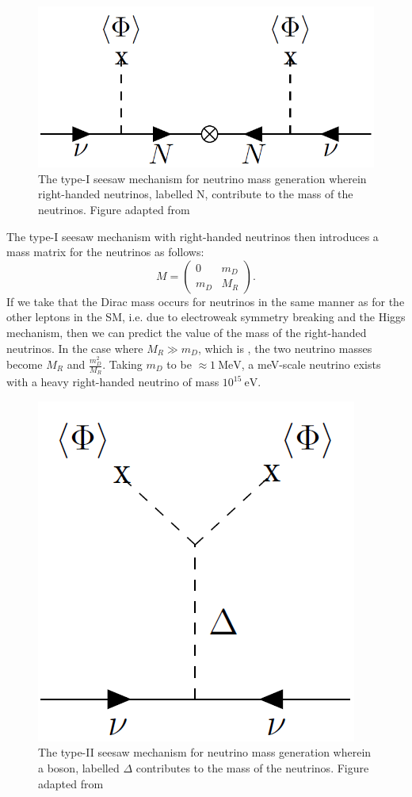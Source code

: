 \begin{figure}[tbph]
\centering
\includegraphics[width=0.40\linewidth]{Figures/TypeISeesaw.png}
\caption[Type-I seesaw mechanism]{The type-I seesaw mechanism for neutrino mass generation wherein right-handed neutrinos, labelled $\textrm{N}$, contribute to the mass of the neutrinos. Figure adapted from \cite{MIRANDA2016436}}
\label{fig:TypeISeesawMechanism}
\end{figure}

The type-I seesaw mechanism with right-handed neutrinos then introduces a mass matrix for the neutrinos as follows:
\begin{equation}
M =\begin{pmatrix}
0 & m_D \\
m_D & M_R
\end{pmatrix}.
\end{equation}
If we take that the Dirac mass occurs for neutrinos in the same manner as for the other leptons in the SM, i.e. due to electroweak symmetry breaking and the Higgs mechanism, then we can predict the value of the mass of the right-handed neutrinos. In the case where $M_R \gg m_D$, which is , the two neutrino masses become $M_R$ and $\frac{m_D^2}{M_R}$. Taking $m_D$ to be $\approx1~\textrm{MeV}$, a meV-scale neutrino exists with a heavy right-handed neutrino of mass $10^{15}~\textrm{eV}$.

\begin{figure}[tbph]
    \centering
\includegraphics[width=0.40\linewidth]{Figures/TypeIISeesaw.png}
    \caption[Type-II seesaw mechanism]{The type-II seesaw mechanism for neutrino mass generation wherein a boson, labelled $\Delta$ contributes to the mass of the neutrinos. Figure adapted from \cite{MIRANDA2016436}}
    \label{fig:TypeIISeesawMechanism}
\end{figure}


